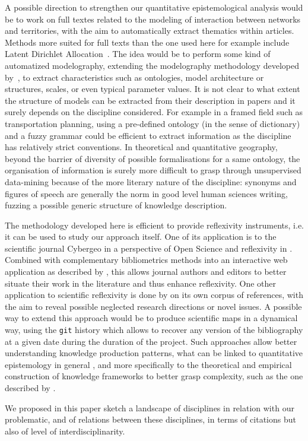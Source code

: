 \documentclass[10pt]{article}
\begin{document}
A possible direction to strengthen our quantitative epistemological analysis would be to work on full textes related to the modeling of interaction between networks and territories, with the aim to automatically extract thematics within articles. Methods more suited for full texts than the one used here for example include Latent Dirichlet Allocation~\cite{blei2003latent}. The idea would be to perform some kind of automatized modelography, extending the modelography methodology developed by~\cite{schmitt2013modelographie}, to extract characteristics such as ontologies, model architecture or structures, scales, or even typical parameter values. It is not clear to what extent the structure of models can be extracted from their description in papers and it surely depends on the discipline considered. For example in a framed field such as transportation planning, using a pre-defined ontology (in the sense of dictionary) and a fuzzy grammar could be efficient to extract information as the discipline has relatively strict conventions. In theoretical and quantitative geography, beyond the barrier of diversity of possible formalisations for a same ontology, the organisation of information is surely more difficult to grasp through unsupervised data-mining because of the more literary nature of the discipline: synonyms and figures of speech are generally the norm in good level human sciences writing, fuzzing a possible generic structure of knowledge description.

The methodology developed here is efficient to provide reflexivity instruments, i.e. it can be used to study our approach itself. One of its application is to the scientific journal Cybergeo in a perspective of Open Science and reflexivity in \cite{raimbault2019exploration}. Combined with complementary bibliometrics methods into an interactive web application as described by \cite{raimbault2021empowering}, this allows journal authors and editors to better situate their work in the literature and thus enhance reflexivity. One other application to scientific reflexivity is done by \cite{raimbault2018caracterisation} on its own corpus of references, with the aim to reveal possible neglected research directions or novel issues. A possible way to extend this approach would be to produce scientific maps in a dynamical way, using the \texttt{git} history which allows to recover any version of the bibliography at a given date during the duration of the project. Such approaches allow better understanding knowledge production patterns, what can be linked to quantitative epistemology in general \cite{chavalarias2013phylomemetic}, and more specifically to the theoretical and empirical construction of knowledge frameworks to better grasp complexity, such as the one described by \cite{raimbault2017applied}.

We proposed in this paper sketch a landscape of disciplines in relation with our problematic, and of relations between these disciplines, in terms of citations but also of level of interdisciplinarity.









%


\end{document}
